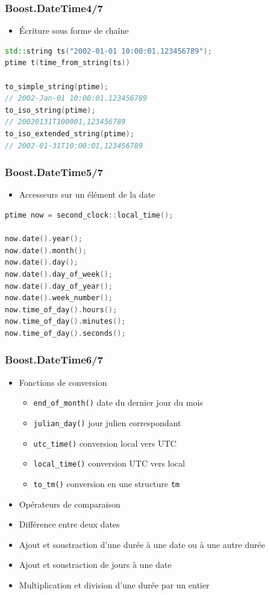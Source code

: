 \documentclass[C++.tex]{subfiles}
\begin{document}
\begin{frame}[fragile]
	\frametitle{Boost.DateTime\titlehfill{}4/7}
	\begin{itemize}
		\item Écriture sous forme de chaîne
	\end{itemize}

	\begin{lstlisting}[language=C++]
std::string ts("2002-01-01 10:00:01.123456789");
ptime t(time_from_string(ts))

to_simple_string(ptime);
// 2002-Jan-01 10:00:01.123456789
to_iso_string(ptime);
// 20020131T100001,123456789
to_iso_extended_string(ptime);
// 2002-01-31T10:00:01,123456789
\end{lstlisting}
\end{frame}

\begin{frame}[fragile]
	\frametitle{Boost.DateTime\titlehfill{}5/7}
	\begin{itemize}
		\item Accesseurs sur un élément de la date
	\end{itemize}

	\begin{lstlisting}[language=C++]
ptime now = second_clock::local_time();

now.date().year();
now.date().month();
now.date().day();
now.date().day_of_week();
now.date().day_of_year();
now.date().week_number();
now.time_of_day().hours();
now.time_of_day().minutes();
now.time_of_day().seconds();\end{lstlisting}
\end{frame}

\begin{frame}[fragile]
	\frametitle{Boost.DateTime\titlehfill{}6/7}
	\begin{itemize}
		\item Fonctions de conversion
		\begin{itemize}
			\item \lstinline|end_of_month()| date du dernier jour du mois
			\item \lstinline|julian_day()| jour julien correspondant
			\item \lstinline|utc_time()| conversion local vers UTC
			\item \lstinline|local_time()| conversion UTC vers local
			\item \lstinline|to_tm()| conversion en une structure \lstinline|tm|
		\end{itemize}
		\item Opérateurs de comparaison
		\item Différence entre deux dates
		\item Ajout et soustraction d'une durée à une date ou à une autre durée
		\item Ajout et soustraction de jours à une date
		\item Multiplication et division d'une durée par un entier
	\end{itemize}
\end{frame}
\end{document}

